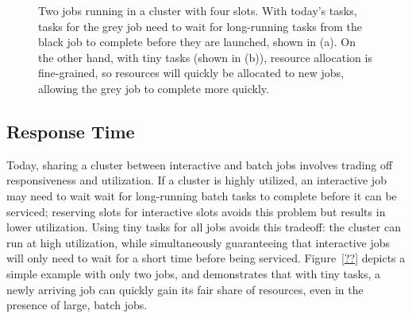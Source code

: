 \begin{figure}[!t]
\centering
{}
\caption{Two jobs running in a cluster with four slots. With today's tasks,
tasks for the grey job need to wait for long-running tasks from the black job to
complete before they are launched, shown in (a).
On the other hand, with tiny tasks (shown in (b)), resource
allocation is fine-grained, so resources will quickly be allocated to new
jobs, allowing the grey job to complete more quickly.}
\vspace{-2ex}
\label{fig:slot_diagram}
\end{figure}



\subsection{Response Time}
Today, sharing a cluster between interactive and batch jobs involves trading off
responsiveness and utilization. If a cluster is highly utilized,
an interactive job may need to wait wait for long-running batch tasks to
complete before it can be serviced; reserving slots for
interactive slots avoids this problem but results in lower utilization.
Using tiny tasks for all jobs avoids this tradeoff: the cluster can run at
high utilization, while
simultaneously guaranteeing that interactive jobs will only need to wait for
a short time before being serviced. Figure~\ref{??} depicts a simple example
with only two jobs, and demonstrates that with tiny tasks, a newly arriving
job can quickly gain its fair share of resources, even in the presence
of large, batch jobs.
